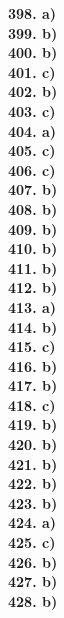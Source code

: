 \documentclass[8pt]{extarticle}
\begin{document}
\begin{multicols}{8}
\textbf{398. a)} \\
\textbf{399. b)} \\
\textbf{400. b)} \\
\textbf{401. c)} \\
\textbf{402. b)} \\
\textbf{403. c)} \\
\textbf{404. a)} \\
\textbf{405. c)} \\
\textbf{406. c)} \\
\textbf{407. b)} \\
\textbf{408. b)} \\
\textbf{409. b)} \\
\textbf{410. b)} \\
\textbf{411. b)} \\
\textbf{412. b)} \\
\textbf{413. a)} \\
\textbf{414. b)} \\
\textbf{415. c)} \\
\textbf{416. b)} \\
\textbf{417. b)} \\
\textbf{418. c)} \\
\textbf{419. b)} \\
\textbf{420. b)} \\
\textbf{421. b)} \\
\textbf{422. b)} \\
\textbf{423. b)} \\
\textbf{424. a)} \\
\textbf{425. c)} \\
\textbf{426. b)} \\
\textbf{427. b)} \\
\textbf{428. b)} 
\end{multicols}

\begin{comment}
b, c, b, b, a, b, b, b, b, b, a, b, c, b, d, b, b, c, a, c, b, b, b, b, c, b, b, a, b, b, a, b, b, b, b, a, b, b, b, c, b, b, c, b, b, b, c, b, b, b, a, b, c, c, b, b, a, b, c, b, b, a, a, a, b, b, b, a, d, a, b, a, b, b, a, b, a, c, b, a, b, b, b, b, a, c, b, b, c, b, c, a, c, b, a, a, a, b, b, c, b, a, a, b, b, b, a, b, a, b, a, b, b, b, a, a, b, b, b, a, b, a, d, a, a, b, b, a, a, a, c, b, b, c, c, b, b, b, a, b, b, a, b, b, b, b, c, d, b, b, b, b, b, b, b, a, c, b, b, a, b, c, b, b, a, b, b, b, a, b, b, b, c, a, b, b, b, b, b, b, b, b, b, b, b, b, c, b, c, b, c, a, b, b, b, a, b, b, a, b, c, b, b, b, b, b, c, c, b, b, b, b, b, b, b, b, b, b, b, b, b, a, b, b, a, b, b, b, b, b, b, c, b, b, b, b, c, b, b, b, b, c, b, b, d, b, d, b, c, b, b, c, b, c, a, b, b, c, a, c, b, a, a, b, a, c, c, a, c, b, b, b, b, c, c, b, b, c, c, a, c, b, a, b, b, c, b, c, a, c, c, b, b, b, b, b, b, a, b, c, b, b, c, b, b, b, b, b, a, c, b, b, b 
\end{comment}
\end{document}
